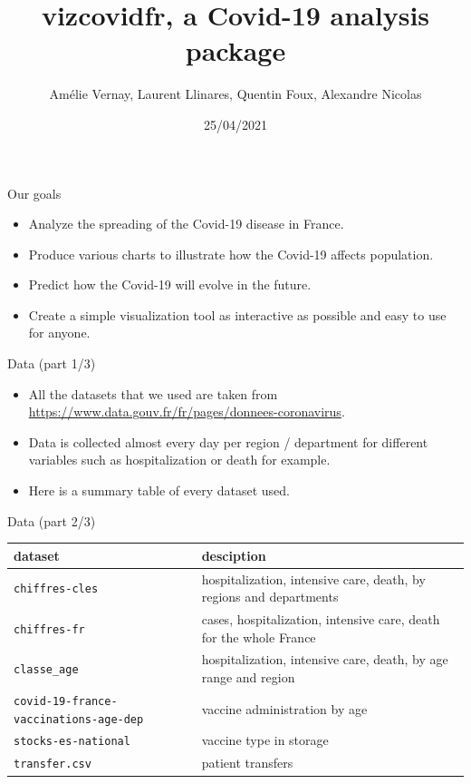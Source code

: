 \documentclass[
  ignorenonframetext,
]{beamer}
\title{vizcovidfr, a Covid-19 analysis package}
\author{Amélie Vernay, Laurent Llinares, Quentin Foux, Alexandre
Nicolas}
\date{25/04/2021}
\providecommand{\tightlist}{%
  \setlength{\itemsep}{0pt}\setlength{\parskip}{0pt}}
\begin{document}
\frame{\titlepage}

\begin{frame}{Our goals}
\protect\hypertarget{our-goals}{}
\begin{itemize}
\tightlist
\item
  Analyze the spreading of the Covid-19 disease in France. \pause
\item
  Produce various charts to illustrate how the Covid-19 affects
  population. \pause
\item
  Predict how the Covid-19 will evolve in the future. \pause
\item
  Create a simple visualization tool as interactive as possible and easy
  to use for anyone.
\end{itemize}
\end{frame}

\begin{frame}{Data (part 1/3)}
\protect\hypertarget{data-part-13}{}
\begin{itemize}
\tightlist
\item
  All the datasets that we used are taken from
  \url{https://www.data.gouv.fr/fr/pages/donnees-coronavirus}. \pause
\item
  Data is collected almost every day per region / department for
  different variables such as hospitalization or death for example.
  \pause
\item
  Here is a summary table of every dataset used. \pause
\end{itemize}
\end{frame}

\begin{frame}[fragile]{Data (part 2/3)}
\protect\hypertarget{data-part-23}{}
\begin{longtable}[]{@{}
  >{\centering\arraybackslash}p{}
  >{\centering\arraybackslash}p{}@{}}
\toprule
dataset & desciption \\
\midrule
\endhead
\texttt{chiffres-cles} & hospitalization, intensive care, death, by
regions and departments \\
\texttt{chiffres-fr} & cases, hospitalization, intensive care, death for
the whole France \\
\texttt{classe\_age} & hospitalization, intensive care, death, by age
range and region \\
\texttt{covid-19-france-vaccinations-age-dep} & vaccine administration
by age \\
\texttt{stocks-es-national} & vaccine type in storage \\
\texttt{transfer.csv} & patient transfers \\
\bottomrule
\end{longtable}
\end{frame}
\end{document}
